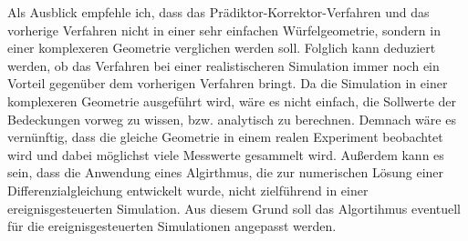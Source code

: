 \documentclass{listhesis}
\begin{document}
Als Ausblick empfehle ich, dass das Prädiktor-Korrektor-Verfahren und das vorherige Verfahren nicht in einer sehr einfachen Würfelgeometrie, sondern in einer komplexeren Geometrie verglichen werden soll. Folglich kann deduziert werden, ob das Verfahren bei einer realistischeren Simulation immer noch ein Vorteil gegenüber dem vorherigen Verfahren bringt. Da die Simulation in einer komplexeren Geometrie ausgeführt wird, wäre es nicht einfach, die Sollwerte der Bedeckungen vorweg zu wissen, bzw. analytisch zu berechnen. Demnach wäre es vernünftig, dass die gleiche Geometrie in einem realen Experiment beobachtet wird und dabei möglichst viele 	Messwerte gesammelt wird. Außerdem kann es sein, dass die Anwendung eines Algirthmus, die zur numerischen Lösung einer Differenzialgleichung entwickelt wurde, nicht zielführend in einer ereignisgesteuerten Simulation. Aus diesem Grund soll das Algortihmus eventuell für die ereignisgesteuerten Simulationen angepasst werden.


\cleardoublepage



\confirmation
\end{document}

